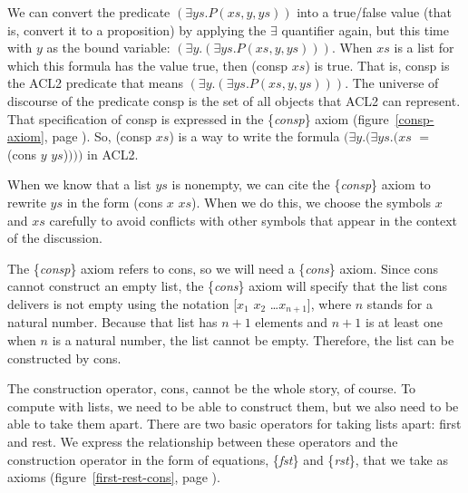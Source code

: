 We can convert the predicate $(\exists ys.P(xs, y, ys))$
into a true/false value (that is, convert it to a proposition)
by applying the $\exists$ quantifier again,
but this time with $y$ as the bound variable:
$(\exists y.(\exists ys.P(xs, y, ys)))$.
When $xs$ is a list for which this formula has the value true,
then \textsf{(consp $xs$)} is true.
That is, \textsf{consp} is the ACL2 predicate that means $(\exists y.(\exists ys.P(xs, y, ys)))$.
The universe of discourse of the predicate \textsf{consp}
is the set of all objects that ACL2 can represent.
That specification of \textsf{consp} is expressed in the \{\emph{consp}\} axiom
(figure~\ref{consp-axiom}, page \pageref{consp-axiom}).
So, \textsf{(consp $xs$)} is a way to write the formula
$(\exists y.(\exists ys.(xs$ $=$ \textsf{(cons $y$ $ys$)}$)))$ in ACL2.

When we know that a list $ys$ is nonempty,
we can cite the \{\emph{consp}\} axiom
to rewrite $ys$ in the form \textsf{(cons $x$ $xs$)}.
When we do this, we choose the symbols $x$ and $xs$ carefully
to avoid conflicts with other symbols that appear in the context of the discussion.

The \{\emph{consp}\} axiom refers to \textsf{cons},
so we will need a \{\emph{cons}\} axiom.
Since \textsf{cons} cannot construct an empty list,
the \{\emph{cons}\} axiom will specify that the list \textsf{cons} delivers is not empty
using the notation \textsf{[$x_1$ $x_2$ \dots $x_{n+1}$]},
where $n$ stands for a natural number.
Because that list has $n+1$ elements and $n+1$
is at least one when $n$ is a natural number,
the list cannot be empty.
Therefore, the list can be constructed by \textsf{cons}.

The construction operator, \textsf{cons}, cannot be the whole story, of course.
To compute with lists, we  need to be able to construct them,
but we also need to be able to take them apart.
There are two basic operators for taking lists apart: \textsf{first} and \textsf{rest}.
We express the relationship between these operators and
the construction operator in the form of equations,
\{\emph{fst}\} and \{\emph{rst}\}, that we take as axioms
(figure~\ref{first-rest-cons}, page \pageref{first-rest-cons}).

